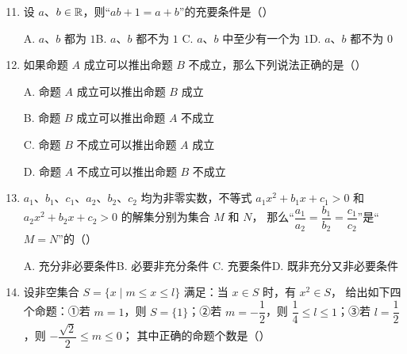 \documentclass[a4paper,11pt]{article}
\begin{document}
\begin{enumerate}
\setcounter{enumi}{10}

\item 设 $a$、$b\in\mathbb{R}$，则“$ab+1=a+b$”的充要条件是\mbox{（\quad）}

\keepwithprev
A. $a$、$b$ 都为 $1$\qquad B. $a$、$b$ 都不为 $1$\qquad
C. $a$、$b$ 中至少有一个为 $1$\qquad D. $a$、$b$ 都不为 $0$


\ifanswer
\solbegin
{}
\solend

\fi

\item 如果命题 $A$ 成立可以推出命题 $B$ 不成立，那么下列说法正确的是\mbox{（\quad）}

\keepwithprev
A. 命题 $A$ 成立可以推出命题 $B$ 成立

B. 命题 $B$ 成立可以推出命题 $A$ 不成立

C. 命题 $B$ 不成立可以推出命题 $A$ 成立

D. 命题 $A$ 不成立可以推出命题 $B$ 不成立


\item $a_1$、$b_1$、$c_1$、$a_2$、$b_2$、$c_2$ 均为非零实数，不等式
$a_1x^2+b_1x+c_1>0$ 和 $a_2x^2+b_2x+c_2>0$ 的解集分别为集合 $M$ 和 $N$，
那么“$\dfrac{a_1}{a_2}=\dfrac{b_1}{b_2}=\dfrac{c_1}{c_2}$”是“$M=N$”的\mbox{（\quad）}

\keepwithprev
A. 充分非必要条件\qquad B. 必要非充分条件\qquad
C. 充要条件\qquad D. 既非充分又非必要条件


\ifanswer
\solbegin
{}
\solend

\fi

\item 设非空集合 $S=\{x\mid m\leqslant x\leqslant l\}$ 满足：当 $x\in S$ 时，有 $x^2\in S$，
给出如下四个命题：①若 $m=1$，则 $S=\{1\}$；②若 $m=-\dfrac12$，则
$\dfrac14\leqslant l\leqslant1$；③若 $l=\dfrac12$，则 $-\dfrac{\sqrt2}2\leqslant m\leqslant0$；
其中正确的命题个数是\mbox{（\quad）}


\end{enumerate}
\end{document}
